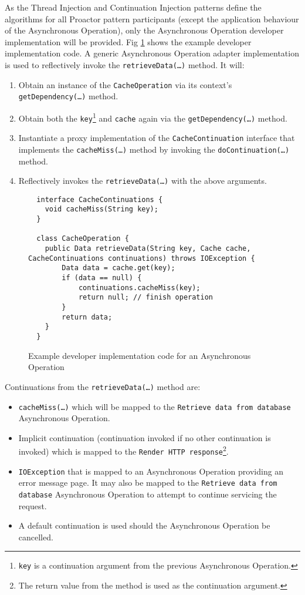 \documentclass[prodmode]{style/acmlarge}
\begin{document}
As the Thread Injection and Continuation Injection patterns define the
algorithms for all Proactor pattern participants (except the application
behaviour of the Asynchronous Operation), only the Asynchronous Operation
developer implementation will be provided.  Fig
\ref{fig:Example_Method_Operation} shows the example developer implementation
code.  A generic Asynchronous Operation adapter implementation is used to
reflectively invoke the \texttt{retrieveData(\ldots)} method. It will:
\begin{enumerate}
  \item Obtain an instance of the \texttt{CacheOperation} via its context's \texttt{getDependency(\ldots)} method.
  \item Obtain both the \texttt{key}\footnote{\texttt{key} is a continuation argument from the previous Asynchronous Operation.} and \texttt{cache} again via the \texttt{getDependency(\ldots)} method.
  \item Instantiate a proxy implementation of the \texttt{CacheContinuation} interface that implements the \texttt{cacheMiss(\ldots)} method by invoking the \texttt{doContinuation(\ldots)} method. 
  \item Reflectively invokes the \texttt{retrieveData(\ldots)} with the above arguments.
\end{enumerate}

\begin{figure}[tp]
\centering
\begin{verbatim}
  interface CacheContinuations {
    void cacheMiss(String key);
  }

  class CacheOperation {    
    public Data retrieveData(String key, Cache cache, CacheContinuations continuations) throws IOException {
        Data data = cache.get(key);
        if (data == null) {
            continuations.cacheMiss(key);
            return null; // finish operation
        }
        return data;
    }
  }
\end{verbatim}
\caption{Example developer implementation code for an Asynchronous Operation}
\label{fig:Example_Method_Operation}
\end{figure}

Continuations from the \texttt{retrieveData(\ldots)} method are:
\begin{itemize}
  \item \texttt{cacheMiss(\ldots)} which will be mapped to the \texttt{Retrieve data from database} Asynchronous Operation.
  \item Implicit continuation (continuation invoked if no other continuation is invoked) which is mapped to the \texttt{Render HTTP response}\footnote{The return value from the method is used as the continuation argument.}.
  \item \texttt{IOException} that is mapped to an Asynchronous Operation providing an error message page.  It may also be mapped to the \texttt{Retrieve data from database} Asynchronous Operation to attempt to continue servicing the request.
  \item A default continuation is used should the Asynchronous Operation be cancelled.
\end{itemize}
\end{document}
